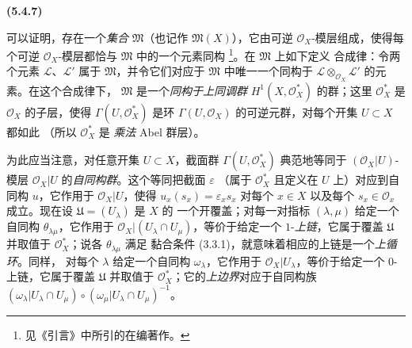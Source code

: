 \documentclass[UTF8,fontset=none,11pt,oneside,openany]{ctexbook}
\newenvironment{env}[1][]{%
  \par\medskip\noindent\textbf{(#1)}\ %
}{\par}
\let\EGAOriginalLabel\label
\renewcommand{\label}[1]{\phantomsection\EGAOriginalLabel{#1}}
\begin{document}
\begin{env}[5.4.7]
\label{0.5.4.7-fr}
可以证明，存在一个\emph{集合} $\mathfrak{M}$（也记作
$\mathfrak{M}(X)$），它由可逆 $\mathcal{O}_X$-模层组成，使得每个可逆
$\mathcal{O}_X$-模层都恰与 $\mathfrak{M}$ 中的一个元素同构
\footnote{见《引言》中所引的在编著作。}。在 $\mathfrak{M}$ 上如下定义
合成律：令两个元素 $\mathcal{L}$、$\mathcal{L}'$ 属于
$\mathfrak{M}$，并令它们对应于 $\mathfrak{M}$ 中唯一一个同构于
$\mathcal{L}\otimes_{\mathcal{O}_X}\mathcal{L}'$ 的元素。在这个合成律下，
$\mathfrak{M}$ 是一个\emph{同构于上同调群}
$H^1(X,\mathcal{O}_X^*)$ 的群；这里 $\mathcal{O}_X^*$ 是
$\mathcal{O}_X$ 的子层，使得 $\Gamma(U,\mathcal{O}_X^*)$ 是环
$\Gamma(U,\mathcal{O}_X)$ 的可逆元群，对每个开集 $U\subset X$ 都如此
（所以 $\mathcal{O}_X^*$ 是
\emph{乘法} Abel 群层）。

为此应当注意，对任意开集 $U\subset X$，截面群
$\Gamma(U,\mathcal{O}_X^*)$ 典范地等同于 $(\mathcal{O}_X|U)$-模层
$\mathcal{O}_X|U$ 的\emph{自同构群}。这个等同把截面 $\varepsilon$
（属于 $\mathcal{O}_X^*$ 且定义在 $U$ 上）对应到自同构 $u$，它作用于
$\mathcal{O}_X|U$，使得
$u_x(s_x)=\varepsilon_xs_x$ 对每个 $x\in X$ 以及每个
$s_x\in\mathcal{O}_x$ 成立。现在设 $\mathfrak{U}=(U_\lambda)$ 是 $X$ 的
一个开覆盖；对每一对指标 $(\lambda,\mu)$ 给定一个自同构
$\theta_{\lambda\mu}$，它作用于
$\mathcal{O}_X|(U_\lambda\cap U_\mu)$，等价于给定一个
$1$-\emph{上链}，它属于覆盖 $\mathfrak{U}$ 并取值于
$\mathcal{O}_X^*$；说各 $\theta_{\lambda\mu}$ 满足
黏合条件 (3.3.1)，就意味着相应的上链是一个\emph{上循环}。同样，
对每个 $\lambda$ 给定一个自同构 $\omega_\lambda$，它作用于
$\mathcal{O}_X|U_\lambda$，等价于给定一个 $0$-上链，它属于覆盖
$\mathfrak{U}$ 并取值于 $\mathcal{O}_X^*$；它的\emph{上边界}对应于自同构族
$(\omega_\lambda|U_\lambda\cap U_\mu)\circ
 (\omega_\mu|U_\lambda\cap U_\mu)^{-1}$。


\end{env}
\end{document}
